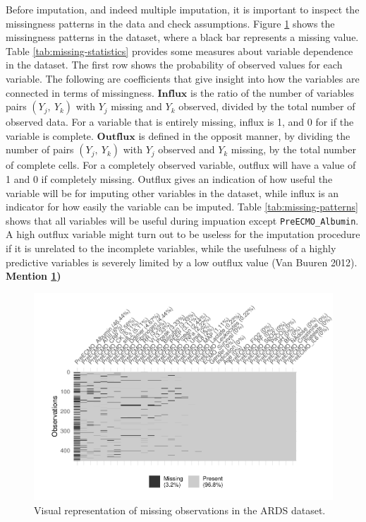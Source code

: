 \documentclass[12pt,]{article}
\begin{document}
Before imputation, and indeed multiple imputation, it is important to
inspect the missingness patterns in the data and check assumptions.
Figure \ref{fig:missing-data} shows the missingness patterns in the
dataset, where a black bar represents a missing value. Table
\ref{tab:missing-statistics} provides some measures about variable
dependence in the dataset. The first row shows the probability of
observed values for each variable. The following are coefficients that
give insight into how the variables are connected in terms of
missingness. \(\mathbf{Influx}\) is the ratio of the number of variables
pairs \((Y_j, ~Y_k)\) with \(Y_j\) missing and \(Y_k\) observed, divided
by the total number of observed data. For a variable that is entirely
missing, influx is 1, and 0 for if the variable is complete.
\(\mathbf{Outflux}\) is defined in the opposit manner, by dividing the
number of pairs \((Y_j, ~Y_k)\) with \(Y_j\) observed and \(Y_k\)
missing, by the total number of complete cells. For a completely
observed variable, outflux will have a value of 1 and 0 if completely
missing. Outflux gives an indication of how useful the variable will be
for imputing other variables in the dataset, while influx is an
indicator for how easily the variable can be imputed. Table
\ref{tab:missing-patterns} shows that all variables will be useful
during impuation except \texttt{PreECMO\_Albumin}. A high outflux
variable might turn out to be useless for the imputation procedure if it
is unrelated to the incomplete variables, while the usefulness of a
highly predictive variables is severely limited by a low outflux value
(Van Buuren 2012). \textbf{Mention \ref{fig:missing-data})}

\begin{figure}[H]

{\centering \includegraphics[width=1\linewidth]{figure/graphics-missing-data-1} 

}

\caption{\label{fig.ensemble-imputation}Visual representation of missing observations in the ARDS dataset.}\label{fig:missing-data}
\end{figure}
\end{document}
